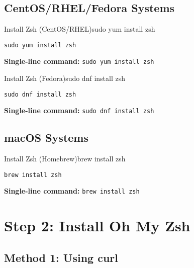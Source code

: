 \documentclass{article}
\begin{document}
\subsection{CentOS/RHEL/Fedora Systems}

\begin{clickablecode}{Install Zsh (CentOS/RHEL)}{sudo yum install zsh}
\begin{lstlisting}
sudo yum install zsh
\end{lstlisting}
\textbf{Single-line command:} \texttt{sudo yum install zsh}
\end{clickablecode}

\begin{clickablecode}{Install Zsh (Fedora)}{sudo dnf install zsh}
\begin{lstlisting}
sudo dnf install zsh
\end{lstlisting}
\textbf{Single-line command:} \texttt{sudo dnf install zsh}
\end{clickablecode}

\subsection{macOS Systems}

\begin{clickablecode}{Install Zsh (Homebrew)}{brew install zsh}
\begin{lstlisting}
brew install zsh
\end{lstlisting}
\textbf{Single-line command:} \texttt{brew install zsh}
\end{clickablecode}

\section{Step 2: Install Oh My Zsh}

\subsection{Method 1: Using curl}

\end{document}
